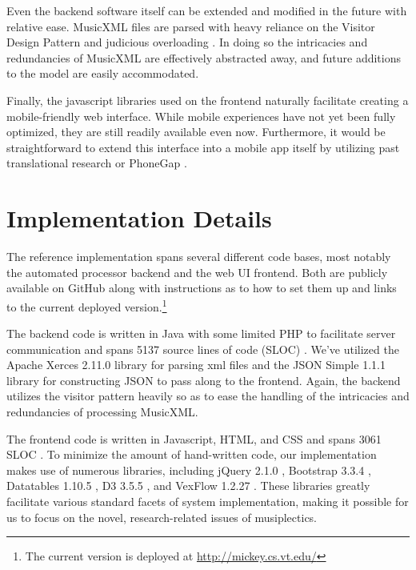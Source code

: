 \documentclass[12pt]{report}
\begin{document}
Even the backend software itself can be extended and modified in the future with relative ease. MusicXML files are parsed with heavy reliance on the Visitor Design Pattern \cite{gamma1994design} and judicious overloading \cite{bloch2008effective}. In doing so the intricacies and redundancies of MusicXML are effectively abstracted away, and future additions to the model are easily accommodated.

Finally, the javascript libraries used on the frontend naturally facilitate creating a mobile-friendly web interface. While mobile experiences have not yet been fully optimized, they are still readily available even now. Furthermore, it would be straightforward to extend this interface into a mobile app itself by utilizing past translational research \cite{holder2013cloudSPLASH} \cite{holder2013cloudASE} or PhoneGap \cite{phonegapBook} \cite{phonegapArticle}.



\section{Implementation Details} 
\label{sec:details}

The reference implementation spans several different code bases, most notably the automated processor backend and the web UI frontend. Both are publicly available on GitHub \cite{GithubMusicScoring} along with instructions as to how to set them up and links to the current deployed version.\footnote{The current version is deployed at \url{http://mickey.cs.vt.edu/}}

The backend code is written in Java \cite{java} with some limited PHP to facilitate server communication and spans 5137 source lines of code (SLOC) \cite{nguyen2007sloc}. We've utilized the Apache Xerces 2.11.0 library for parsing xml files \cite{XMLAPI} and the JSON Simple 1.1.1 library \cite{JSONAPI} for constructing JSON to pass along to the frontend. Again, the backend utilizes the visitor pattern heavily so as to ease the handling of the intricacies and redundancies of processing MusicXML.

The frontend code is written in Javascript, HTML, and CSS and spans 3061 SLOC \cite{nguyen2007sloc}. To minimize the amount of hand-written code, our implementation makes use of numerous libraries, including jQuery 2.1.0 \cite{jQuery}, Bootstrap 3.3.4 \cite{Bootstrap}, Datatables 1.10.5 \cite{DataTables}, D3 3.5.5 \cite{D3}, and VexFlow 1.2.27 \cite{VexFlow}. These libraries greatly facilitate various standard facets of system implementation, making it possible for us to focus on the novel, research-related issues of musiplectics.
\end{document}
